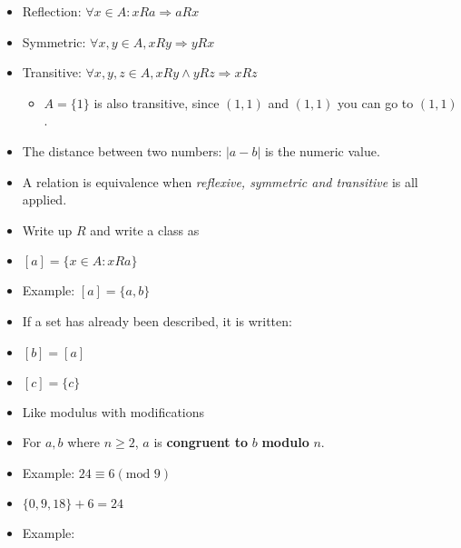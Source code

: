 \documentclass[english,10pt,a4paper]{article}
\begin{document}
\begin{theo}[Reflection] 
\begin{itemize}
\item Reflection: $\forall x \in A: xRa \Rightarrow aRx$
\end{itemize}
\end{theo}

\begin{theo}[Symmetric] 
\begin{itemize}
\item Symmetric: $\forall x, y \in A, xRy \Rightarrow yRx$
\end{itemize}
\end{theo}

\begin{theo}[Transitive] 
\begin{itemize}
\item Transitive: $\forall x,y,z \in A, xRy \wedge yRz \Rightarrow xRz$
\begin{itemize}
\item $A=\{1\}$ is also transitive, since $(1,1)$ and $(1,1)$ you can go to $(1,1)$.
\end{itemize}
\end{itemize}
\end{theo}

\begin{theo}[Distance] 
\begin{itemize}
\item The distance between two numbers: $|a-b|$ is the numeric value.
\end{itemize}
\end{theo}

\begin{theo} 
\begin{itemize}
\item A relation is equivalence when \textit{reflexive, symmetric and transitive} is all applied.
\item Write up $R$ and write a class as
\item[] $[a]=\{x \in A: x R a\}$
\item[] Example:  $[a]=\{a,b\}$
\item If a set has already been described, it is written:
\item[] $[b] = [a]$
\item[] $[c] = \{c\}$
\end{itemize}
\end{theo}

\begin{theo} 
\begin{itemize}
\item Like modulus with modifications
\item For $a,b$ where $n \geq 2$, $a$ is \textbf{congruent to} $b$ \textbf{modulo} $n$.
\item[] Example: $24 \equiv 6 (\text{mod 9})$
\item[] $\{0, 9, 18\} + 6 = 24$
\item[] Example: 
\end{itemize}
\end{theo}
\end{document}
